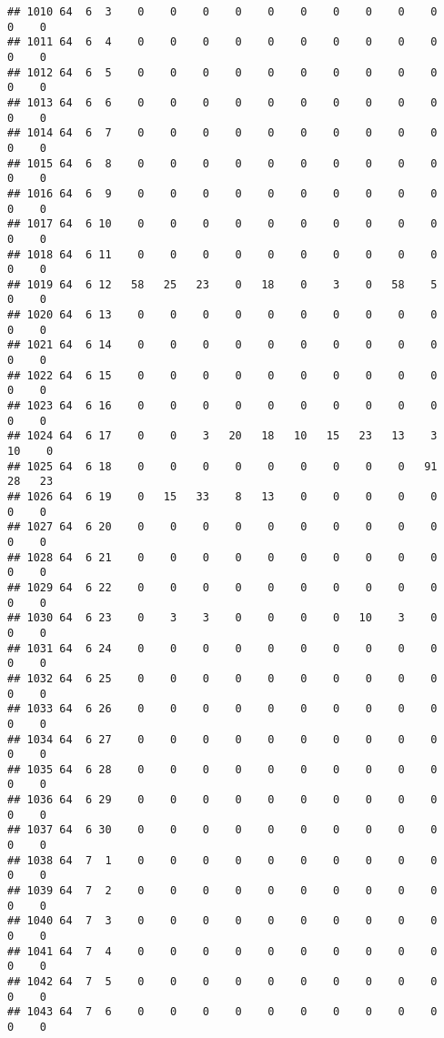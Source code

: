 \documentclass[]{article}
\begin{document}
\begin{verbatim}
## 1010 64  6  3    0    0    0    0    0    0    0    0    0    0    0    0
## 1011 64  6  4    0    0    0    0    0    0    0    0    0    0    0    0
## 1012 64  6  5    0    0    0    0    0    0    0    0    0    0    0    0
## 1013 64  6  6    0    0    0    0    0    0    0    0    0    0    0    0
## 1014 64  6  7    0    0    0    0    0    0    0    0    0    0    0    0
## 1015 64  6  8    0    0    0    0    0    0    0    0    0    0    0    0
## 1016 64  6  9    0    0    0    0    0    0    0    0    0    0    0    0
## 1017 64  6 10    0    0    0    0    0    0    0    0    0    0    0    0
## 1018 64  6 11    0    0    0    0    0    0    0    0    0    0    0    0
## 1019 64  6 12   58   25   23    0   18    0    3    0   58    5    0    0
## 1020 64  6 13    0    0    0    0    0    0    0    0    0    0    0    0
## 1021 64  6 14    0    0    0    0    0    0    0    0    0    0    0    0
## 1022 64  6 15    0    0    0    0    0    0    0    0    0    0    0    0
## 1023 64  6 16    0    0    0    0    0    0    0    0    0    0    0    0
## 1024 64  6 17    0    0    3   20   18   10   15   23   13    3   10    0
## 1025 64  6 18    0    0    0    0    0    0    0    0    0   91   28   23
## 1026 64  6 19    0   15   33    8   13    0    0    0    0    0    0    0
## 1027 64  6 20    0    0    0    0    0    0    0    0    0    0    0    0
## 1028 64  6 21    0    0    0    0    0    0    0    0    0    0    0    0
## 1029 64  6 22    0    0    0    0    0    0    0    0    0    0    0    0
## 1030 64  6 23    0    3    3    0    0    0    0   10    3    0    0    0
## 1031 64  6 24    0    0    0    0    0    0    0    0    0    0    0    0
## 1032 64  6 25    0    0    0    0    0    0    0    0    0    0    0    0
## 1033 64  6 26    0    0    0    0    0    0    0    0    0    0    0    0
## 1034 64  6 27    0    0    0    0    0    0    0    0    0    0    0    0
## 1035 64  6 28    0    0    0    0    0    0    0    0    0    0    0    0
## 1036 64  6 29    0    0    0    0    0    0    0    0    0    0    0    0
## 1037 64  6 30    0    0    0    0    0    0    0    0    0    0    0    0
## 1038 64  7  1    0    0    0    0    0    0    0    0    0    0    0    0
## 1039 64  7  2    0    0    0    0    0    0    0    0    0    0    0    0
## 1040 64  7  3    0    0    0    0    0    0    0    0    0    0    0    0
## 1041 64  7  4    0    0    0    0    0    0    0    0    0    0    0    0
## 1042 64  7  5    0    0    0    0    0    0    0    0    0    0    0    0
## 1043 64  7  6    0    0    0    0    0    0    0    0    0    0    0    0

\end{verbatim}
\end{document}
